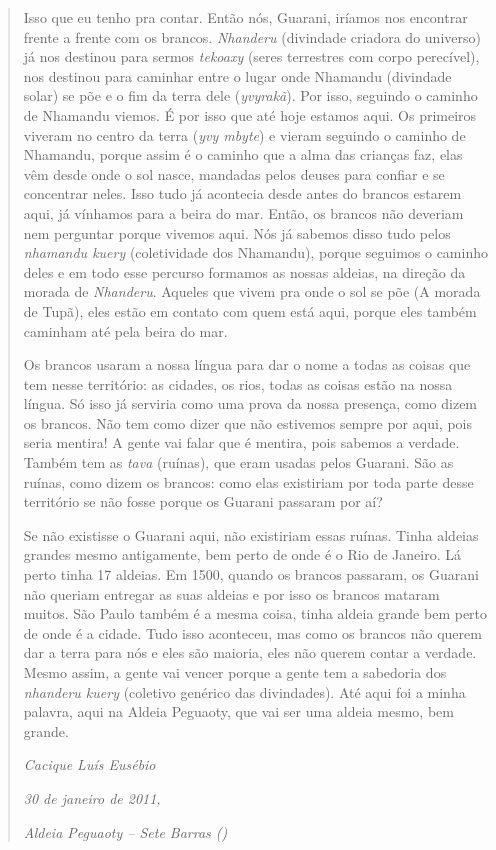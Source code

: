 \begin{quotation}
\noindent
Isso que eu tenho pra contar. Então nós, Guarani, iríamos nos encontrar
frente a frente com os brancos. \emph{Nhanderu} (divindade criadora do
universo) já nos destinou para sermos \emph{tekoaxy} (seres terrestres com
corpo perecível), nos destinou para caminhar entre o lugar onde
Nhamandu (divindade solar) se põe e o fim da terra dele
(\emph{yvyrakã}). Por isso, seguindo o caminho de Nhamandu viemos. É por isso
que até hoje estamos aqui. Os primeiros viveram no centro da terra (\emph{yvy
mbyte}) e vieram seguindo o caminho de Nhamandu, porque assim é o caminho
que a alma das crianças faz, elas vêm desde onde o sol nasce, mandadas
pelos deuses para confiar e se concentrar neles. Isso tudo já acontecia
desde antes do brancos estarem aqui, já vínhamos para a beira do mar.
Então, os brancos não deveriam nem perguntar porque vivemos aqui. Nós
já sabemos disso tudo pelos \emph{nhamandu kuery} (coletividade dos Nhamandu),
porque seguimos o caminho deles e em todo esse percurso formamos as
nossas aldeias, na direção da morada de \emph{Nhanderu}. Aqueles que vivem pra
onde o sol se põe (A morada de Tupã), eles estão em contato com
quem está aqui, porque eles também caminham até pela beira do mar. 

\noindent
Os brancos usaram a nossa língua para dar o nome a todas as coisas que
tem nesse território: as cidades, os rios, todas as coisas estão na
nossa língua. Só isso já serviria como uma prova da nossa presença,
como dizem os brancos. Não tem como dizer que não estivemos sempre por
aqui, pois seria mentira! A gente vai falar que é mentira, pois sabemos a
verdade. Também tem as \emph{tava} (ruínas), que eram usadas pelos Guarani.
São as ruínas, como dizem os brancos: como elas existiriam por toda
parte desse território se não fosse porque os Guarani passaram por aí? 

\noindent
Se não existisse o Guarani aqui, não existiriam essas ruínas. Tinha
aldeias grandes mesmo antigamente, bem perto de onde é o Rio de
Janeiro. Lá perto tinha 17 aldeias. Em 1500, quando os brancos
passaram, os Guarani não queriam entregar as suas aldeias e por isso os
brancos mataram muitos. São Paulo também é a mesma coisa, tinha aldeia
grande bem perto de onde é a cidade. Tudo isso aconteceu, mas como os
brancos não querem dar a terra para nós e eles são maioria, eles não
querem contar a verdade. Mesmo assim, a gente vai vencer porque a gente
tem a sabedoria dos \emph{nhanderu kuery} (coletivo genérico das divindades).
Até aqui foi a minha palavra, aqui na Aldeia Peguaoty, que vai ser uma
aldeia mesmo, bem grande.
\medskip
\begin{flushright}
\emph{Cacique Luís Eusébio}

\emph{30 de janeiro de 2011,}

\emph{Aldeia Peguaoty – Sete Barras ()}

\end{flushright}
\end{quotation}

